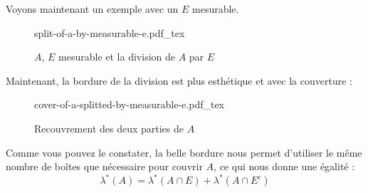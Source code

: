 \documentclass[a4paper]{article}
\newcommand{\incfig}[1]{%
    \def\svgwidth{\columnwidth}
    {#1.pdf_tex}
}
\begin{document}
Voyons maintenant un exemple avec un $E$ mesurable.%
\begin{figure}[H]
    \centering
    \incfig{split-of-a-by-measurable-e}
    \caption{$A$, $E$ mesurable et la division de $A$ par $E$}
    \label{fig:split-of-a-by-measurable-e}
\end{figure}%
Maintenant, la bordure de la division est plus esthétique et avec la couverture :%
\begin{figure}[H]
    \centering
    \incfig{cover-of-a-splitted-by-measurable-e}
    \caption{Recouvrement des deux parties de $A$}
    \label{fig:cover-of-a-splitted-by-measurable-e}
\end{figure}%
Comme vous pouvez le constater, la belle bordure nous permet d'utiliser le même nombre de boîtes que nécessaire pour couvrir $A$, ce qui nous donne une égalité :
 \[
\lambda^*(A) = \lambda^*(A \cap E) + \lambda^*(A \cap E^c)
\]%
\end{document}
